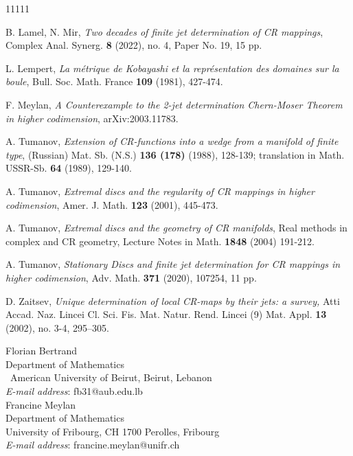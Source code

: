 \documentclass[12pt]{amsart}
\theoremstyle{remark}
\theoremstyle{example}
\theoremstyle{definition}
\numberwithin{equation}{section}
\begin{document}
\begin{thebibliography}{11111}
 
 B. Lamel, N. Mir, {\it Two decades of finite jet determination of CR mappings}, Complex Anal. Synerg. {\bf 8} (2022), no. 4,
Paper No. 19, 15 pp.

 L. Lempert, {\it La m\'etrique de Kobayashi et la repr\'esentation des domaines sur la boule}, Bull. Soc. Math. France 
{\bf 109} (1981), 427-474.


 F. Meylan, {\it A Counterexample to the 2-jet determination Chern-Moser Theorem in higher codimension}, arXiv:2003.11783.  


  A. Tumanov,  {\it Extension of CR-functions into a wedge from a manifold of finite type}, (Russian) Mat. Sb. (N.S.) {\bf 136 (178)} 
(1988), 128-139; translation in Math. USSR-Sb. {\bf 64} (1989), 129-140.

 A. Tumanov, {\it Extremal discs and the regularity of CR mappings in higher codimension}, Amer. J. Math. {\bf 123} (2001), 445-473.


 A. Tumanov, {\it Extremal discs and the geometry of CR manifolds}, Real methods in complex and CR geometry,  Lecture Notes in 
Math. {\bf 1848} (2004) 191-212.

 A. Tumanov, {\it Stationary Discs and finite jet determination for CR mappings in higher codimension},   Adv. Math. {\bf 371} (2020), 
107254, 11 pp.


 D. Zaitsev, \textit{Unique determination of local CR-maps by their jets: a survey,}
Atti Accad. Naz. Lincei Cl. Sci. Fis. Mat. Natur. Rend. Lincei (9) Mat. Appl.   {\bf 13} (2002), no. 3-4, 295–305.

\end{thebibliography}


\vskip 1cm



{\small
\noindent Florian Bertrand\\
Department of Mathematics\\\
American University of Beirut, Beirut, Lebanon\\{\sl E-mail address}: fb31@aub.edu.lb\\



\noindent Francine Meylan \\
Department of Mathematics\\
University of Fribourg, CH 1700 Perolles, Fribourg\\
{\sl E-mail address}: francine.meylan@unifr.ch\\
} 


 
\end{document}
